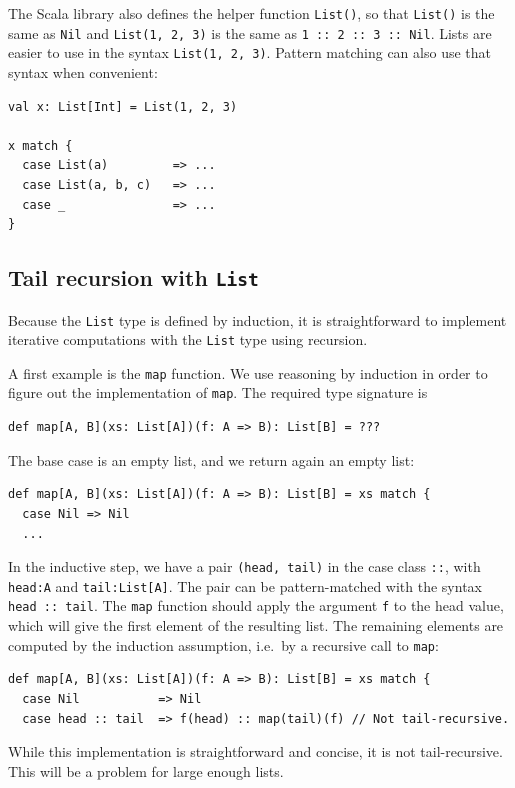 The Scala library also defines the helper function \lstinline!List()!,
so that \lstinline!List()! is the same as \lstinline!Nil! and \lstinline!List(1, 2, 3)!
is the same as \lstinline!1 :: 2 :: 3 :: Nil!. Lists are easier to
use in the syntax \lstinline!List(1, 2, 3)!. Pattern matching can
also use that syntax when convenient:
\begin{lstlisting}
val x: List[Int] = List(1, 2, 3)

x match {
  case List(a)         => ...
  case List(a, b, c)   => ...
  case _               => ...
}
\end{lstlisting}


\subsection{Tail recursion with \texttt{List}\label{subsec:Tail-recursion-with-list}}

Because the \lstinline!List! type is defined by induction, it is
straightforward to implement iterative computations with the \lstinline!List!
type using recursion.

A first example is the \lstinline!map! function. We use reasoning
by induction in order to figure out the implementation of \lstinline!map!.
The required type signature is
\begin{lstlisting}
def map[A, B](xs: List[A])(f: A => B): List[B] = ???
\end{lstlisting}
The base case is an empty list, and we return again an empty list:
\begin{lstlisting}
def map[A, B](xs: List[A])(f: A => B): List[B] = xs match {
  case Nil => Nil
  ...
\end{lstlisting}
In the inductive step, we have a pair \lstinline!(head, tail)! in
the case class \lstinline!::!, with \lstinline!head:A! and \lstinline!tail:List[A]!.
The pair can be pattern-matched with the syntax \lstinline!head :: tail!.
The \lstinline!map! function should apply the argument \lstinline!f!
to the head value, which will give the first element of the resulting
list. The remaining elements are computed by the induction assumption,
i.e.~by a recursive call to \lstinline!map!:
\begin{lstlisting}
def map[A, B](xs: List[A])(f: A => B): List[B] = xs match {
  case Nil           => Nil
  case head :: tail  => f(head) :: map(tail)(f) // Not tail-recursive.
\end{lstlisting}
While this implementation is straightforward and concise, it is not
tail-recursive. This will be a problem for large enough lists.

